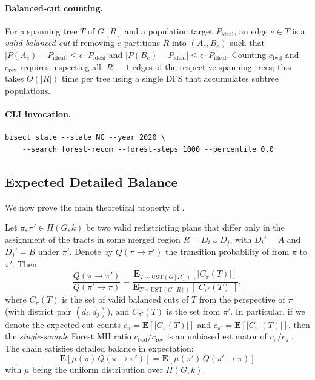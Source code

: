 \paragraph{Balanced-cut counting.}
For a spanning tree $T$ of $G[R]$ and a population target $P_{\mathrm{ideal}}$,
an edge $e \in T$ is a \emph{valid balanced cut} if removing $e$ partitions
$R$ into $(A_e, B_e)$ such that
$|P(A_e) - P_{\mathrm{ideal}}| \leq \epsilon \cdot P_{\mathrm{ideal}}$
and
$|P(B_e) - P_{\mathrm{ideal}}| \leq \epsilon \cdot P_{\mathrm{ideal}}$.
Counting $c_{\mathrm{fwd}}$ and $c_{\mathrm{rev}}$ requires inspecting all
$|R| - 1$ edges of the respective spanning trees; this takes $O(|R|)$ time
per tree using a single DFS that accumulates subtree populations.

\paragraph{CLI invocation.}
\begin{verbatim}
bisect state --state NC --year 2020 \
    --search forest-recom --forest-steps 1000 --percentile 0.0
\end{verbatim}

\subsection{Expected Detailed Balance}

We now prove the main theoretical property of \fr{}.

\begin{theorem}
\label{thm:edb}
Let $\pi, \pi' \in \Pi(G, k)$ be two valid redistricting plans that differ
only in the assignment of the tracts in some merged region $R = D_i \cup D_j$,
with $D_i' = A$ and $D_j' = B$ under $\pi'$.
Denote by $Q(\pi \to \pi')$ the transition probability of \fr{} from $\pi$
to $\pi'$.
Then:
\[
  \frac{Q(\pi \to \pi')}{Q(\pi' \to \pi)}
  = \frac{\mathbf{E}_{T \sim \mathrm{UST}(G[R])}\!\left[|C_{\pi}(T)|\right]}
         {\mathbf{E}_{T \sim \mathrm{UST}(G[R])}\!\left[|C_{\pi'}(T)|\right]},
\]
where $C_{\pi}(T)$ is the set of valid balanced cuts of $T$ from the
perspective of $\pi$ (with district pair $(d_i, d_j)$), and $C_{\pi'}(T)$
is the set from $\pi'$.
In particular, if we denote the expected cut counts
$\bar{c}_\pi = \mathbf{E}[|C_{\pi}(T)|]$ and
$\bar{c}_{\pi'} = \mathbf{E}[|C_{\pi'}(T)|]$, then the \emph{single-sample}
Forest \recom{} MH ratio $c_{\mathrm{fwd}} / c_{\mathrm{rev}}$ is an
unbiased estimator of $\bar{c}_\pi / \bar{c}_{\pi'}$.
The chain satisfies detailed balance in expectation:
\[
  \mathbf{E}\!\left[\mu(\pi)\, Q(\pi \to \pi')\right]
  = \mathbf{E}\!\left[\mu(\pi')\, Q(\pi' \to \pi)\right]
\]
with $\mu$ being the uniform distribution over $\Pi(G,k)$.
\end{theorem}

